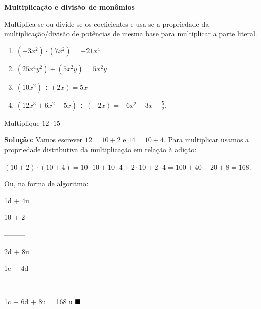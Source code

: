 \begin{caixa}

    \textbf{Multiplicação e divisão de monômios}
    
    \vspace{5mm}
    
    Multiplica-se ou divide-se os coeficientes e usa-se a propriedade da multiplicação/divisão de potências de mesma base para multiplicar a parte literal.
    
\end{caixa}

\begin{texemplo}
\begin{enumerate}[label=(\alph*)]
    \item $(-3x^2 ) \cdot (7x^2) = -21x^4$
    \item $(25x^4 y^2) \div (5x^2 y) = 5x^2y$
    \item $(10x^2) \div (2x) = 5x$
    \item $(12x^3 + 6x^2 - 5x) \div (-2x) = -6x^2 - 3x + \frac{5}{2}$.   
\end{enumerate}
\end{texemplo}

\begin{texemplo}
Multiplique $12 \cdot 15$

\textbf{Solução: }
Vamos escrever $12 = 10 + 2$ e $14 = 10 + 4$. Para multiplicar usamos a propriedade distributiva da multiplicação em relação à adição:

$(10 + 2) \cdot  (10 + 4) = 10 \cdot 10 + 10 \cdot 4 + 2 \cdot 10 + 2 \cdot 4 = 100 + 40 + 20 + 8 = 168$.

Ou, na forma de algoritmo:

\hspace{7mm} 1d + 4u

\hspace{7mm} 10 + 2

\hspace{7mm} ---------

\hspace{7mm} 2d    + 8u

\hspace{-1mm} 1c  + 4d

            ---------------

            1c + 6d + 8u        = 168 u $\qedsymbol$


\end{texemplo}


